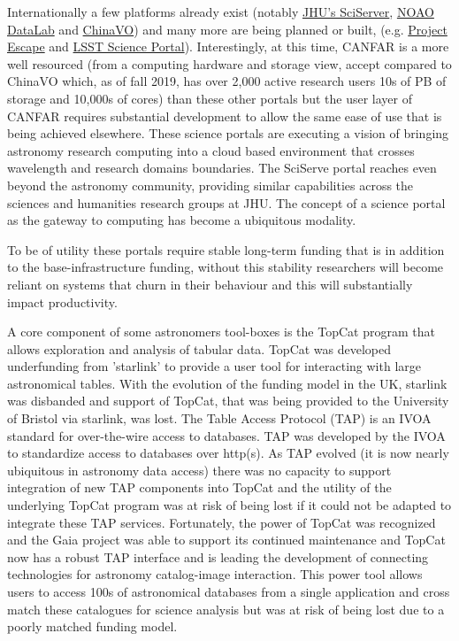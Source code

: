 \documentclass[11pt]{article}
\begin{document}
Internationally a few platforms already exist (notably  \href{http://sciserver.org}{JHU's SciServer}, \href{https://datalab.noao.edu/}{NOAO DataLab} and \href{http://astrocloud.china-vo.org}{ChinaVO}) and many more are being planned or built, (e.g. \href{https://projectescape.eu/services/escape-science-platform}{Project Escape} and \href{https://docushare.lsst.org/docushare/dsweb/Get/LSE-319}{LSST Science Portal}).  
Interestingly, at this time, CANFAR is a more well resourced (from a computing hardware and storage view, accept compared to ChinaVO which, as of fall 2019, has over 2,000 active research users 10s of PB of storage and 10,000s of cores) than these other portals but the user layer of CANFAR requires substantial development to allow the same ease of use that is being achieved elsewhere.
These science portals are executing a vision of bringing astronomy research computing into a cloud based environment that crosses wavelength and research domains boundaries. 
The SciServe portal reaches even beyond the astronomy community, providing similar capabilities across the sciences and humanities research groups at JHU.
The concept of a science portal as the gateway to computing has become a ubiquitous modality. 

To be of utility these portals require stable long-term funding that is in addition to the base-infrastructure funding, without this stability researchers will become reliant on systems that churn in their behaviour and this will substantially impact productivity.  

A core component of some astronomers tool-boxes is the TopCat program that allows exploration and analysis of tabular data.  
TopCat was developed underfunding from 'starlink' to provide a user tool for interacting with large astronomical tables.
With the evolution of the funding model in the UK, starlink was disbanded and support of TopCat, that was being provided to the University of Bristol via starlink, was lost. 
The Table Access Protocol (TAP) is an IVOA standard for over-the-wire access to databases. 
TAP was developed by the IVOA to standardize access to databases over http(s).  
As TAP evolved (it is now nearly ubiquitous in astronomy data access) there was no capacity to support integration of new TAP components into TopCat and the utility of the underlying TopCat program was at risk of being lost if it could not be adapted to integrate these TAP services.
Fortunately, the power of TopCat was recognized and the Gaia project was able to support its continued maintenance and TopCat now has a robust TAP interface and is leading the development of connecting technologies for astronomy catalog-image interaction. 
This power tool allows users to access 100s of astronomical databases from a single application and cross match these catalogues for science analysis but was at risk of being lost due to a poorly matched funding model.
\end{document}
